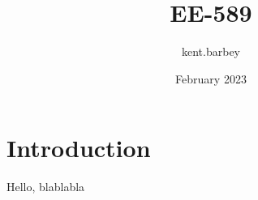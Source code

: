 \documentclass{article}
\title{EE-589}
\author{kent.barbey }
\date{February 2023}
\begin{document}
\maketitle

\section{Introduction}
Hello, blablabla
\end{document}
